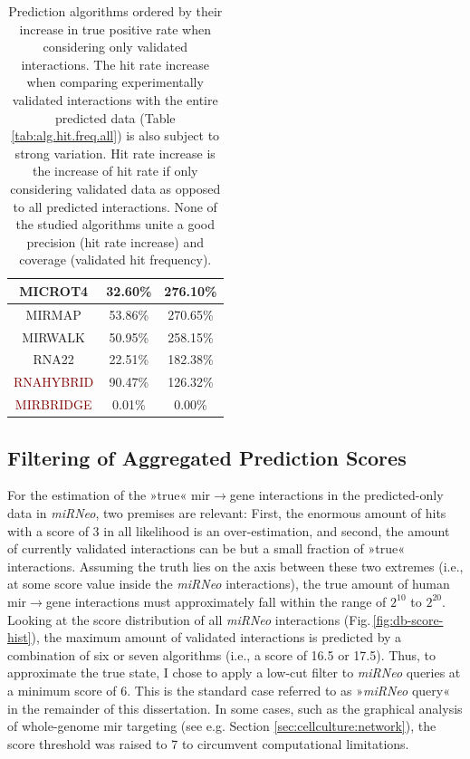 \begin{table}
{\begin{tabular}{c | c | c}
\textcolor{OliveGreen}{MICROT4} & 32.60\% & 276.10\%\\ \hline
\textcolor{OliveGreen}{MIRMAP} & 53.86\% & 270.65\%\\ \hline
\textcolor{OliveGreen}{MIRWALK} & 50.95\% & 258.15\%\\ \hline
\textcolor{OliveGreen}{RNA22} & 22.51\% & 182.38\%\\ \hline
\textcolor{Maroon}{RNAHYBRID} & 90.47\% & 126.32\%\\ \hline
\textcolor{Maroon}{MIRBRIDGE} & 0.01\% & 0.00\%\\ \hline
\end{tabular}
\caption{Prediction algorithms ordered by their increase in true positive rate when considering only validated interactions. The hit rate increase when comparing experimentally validated interactions with the entire predicted data (Table \ref{tab:alg.hit.freq.all}) is also subject to strong variation. Hit rate increase is the increase of hit rate if only considering validated data as opposed to all predicted interactions. None of the studied algorithms unite a good precision (hit rate increase) and coverage (validated hit frequency).}
\label{tab:alg.hit.freq.val}
}
\end{table}

\subsection{Filtering of Aggregated Prediction Scores}
For the estimation of the »true« \ac{mir}$\to$gene interactions in the predicted-only data in \textit{miRNeo}, two premises are relevant: First, the enormous amount of hits with a score of 3 in all likelihood is an over-estimation, and second, the amount of currently validated interactions can be but a small fraction of »true« interactions. Assuming the truth lies on the axis between these two extremes (i.e., at some score value inside the \textit{miRNeo} interactions), the true amount of human \ac{mir}$\to$gene interactions must approximately fall within the range of $2^{10}$ to $2^{20}$. Looking at the score distribution of all \textit{miRNeo} interactions (Fig.\,\ref{fig:db-score-hist}), the maximum amount of validated interactions is predicted by a combination of six or seven algorithms (i.e., a score of 16.5 or 17.5). Thus, to approximate the true state, I chose to apply a low-cut filter to \textit{miRNeo} queries at a minimum score of 6. This is the standard case referred to as »\textit{miRNeo} query« in the remainder of this dissertation. In some cases, such as the graphical analysis of whole-genome \ac{mir} targeting (see e.g. Section \ref{sec:cellculture:network}), the score threshold was raised to 7 to circumvent computational limitations.

